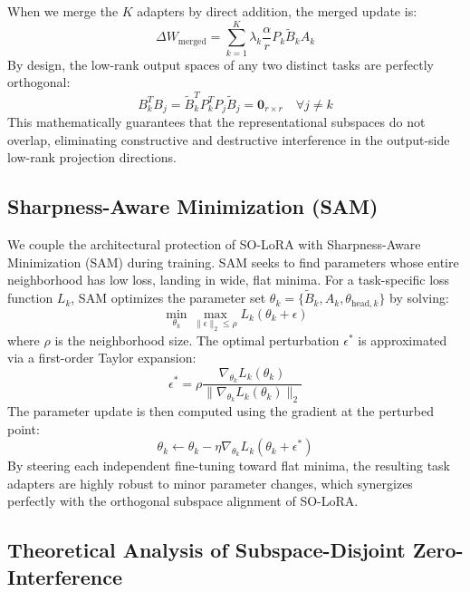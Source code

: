 \documentclass{article}
\theoremstyle{plain}
\theoremstyle{definition}
\theoremstyle{remark}
\begin{document}
When we merge the $K$ adapters by direct addition, the merged update is:
\begin{equation}
  \Delta W_{\text{merged}} = \sum_{k=1}^K \lambda_k \frac{\alpha}{r} P_k \tilde{B}_k A_k
\end{equation}
By design, the low-rank output spaces of any two distinct tasks are perfectly orthogonal:
\begin{equation}
  B_k^T B_j = \tilde{B}_k^T P_k^T P_j \tilde{B}_j = \mathbf{0}_{r \times r} \quad \forall j \neq k
\end{equation}
This mathematically guarantees that the representational subspaces do not overlap, eliminating constructive and destructive interference in the output-side low-rank projection directions.

\subsection{Sharpness-Aware Minimization (SAM)}

We couple the architectural protection of SO-LoRA with Sharpness-Aware Minimization (SAM) \cite{foret2021sam} during training. SAM seeks to find parameters whose entire neighborhood has low loss, landing in wide, flat minima.
For a task-specific loss function $L_k$, SAM optimizes the parameter set $\theta_k = \{\tilde{B}_k, A_k, \theta_{\text{head}, k}\}$ by solving:
\begin{equation}
  \min_{\theta_k} \max_{\|\epsilon\|_2 \le \rho} L_k(\theta_k + \epsilon)
\end{equation}
where $\rho$ is the neighborhood size. The optimal perturbation $\epsilon^*$ is approximated via a first-order Taylor expansion:
\begin{equation}
  \epsilon^* = \rho \frac{\nabla_{\theta_k} L_k(\theta_k)}{\|\nabla_{\theta_k} L_k(\theta_k)\|_2}
\end{equation}
The parameter update is then computed using the gradient at the perturbed point:
\begin{equation}
  \theta_k \leftarrow \theta_k - \eta \nabla_{\theta_k} L_k(\theta_k + \epsilon^*)
\end{equation}
By steering each independent fine-tuning toward flat minima, the resulting task adapters are highly robust to minor parameter changes, which synergizes perfectly with the orthogonal subspace alignment of SO-LoRA.

\subsection{Theoretical Analysis of Subspace-Disjoint Zero-Interference}
\end{document}
